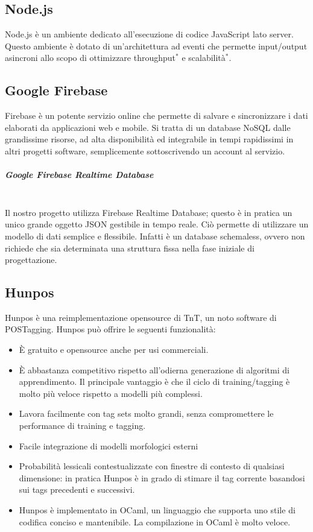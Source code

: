 \subsection{Node.js}
Node.js è un ambiente dedicato all'esecuzione di codice JavaScript lato server. Questo ambiente è dotato di un'architettura ad eventi che permette input/output asincroni allo scopo di ottimizzare throughput$^*$ e scalabilità$^*$.
\subsection{Google Firebase}
Firebase è un potente servizio online che permette di salvare e sincronizzare i dati elaborati da applicazioni web e mobile. Si tratta di un database NoSQL dalle grandissime risorse, ad alta disponibilità ed integrabile in tempi rapidissimi in altri progetti software, semplicemente sottoscrivendo un account al servizio.

\subparagraph{Google Firebase Realtime Database}
 \noindent \\Il nostro progetto utilizza Firebase Realtime Database; questo è in pratica un unico grande oggetto JSON gestibile in tempo reale. Ciò permette di utilizzare un modello di dati semplice e flessibile. Infatti è un database schemaless, ovvero non richiede che sia determinata una struttura fissa nella fase iniziale di progettazione. 
\subsection{Hunpos}
Hunpos è una reimplementazione opensource di TnT, un noto software di POSTagging.
Hunpos può offrire le seguenti funzionalità:
\begin{itemize}
\item È gratuito e opensource anche per usi commerciali.

\item È abbastanza competitivo rispetto all'odierna generazione di algoritmi di apprendimento. Il principale vantaggio è che il ciclo di training/tagging è molto più veloce rispetto a modelli più complessi.

\item Lavora facilmente con tag sets molto grandi,
senza compromettere le performance di training e tagging.

\item Facile integrazione di modelli morfologici esterni

\item Probabilità lessicali contestualizzate con finestre di contesto di qualsiasi dimensione: in pratica Hunpos è in grado di stimare il tag corrente basandosi sui tags precedenti e successivi.

\item Hunpos è implementato in OCaml, un linguaggio che supporta uno stile di codifica conciso e mantenibile. La compilazione in OCaml è molto veloce.
\end{itemize}
